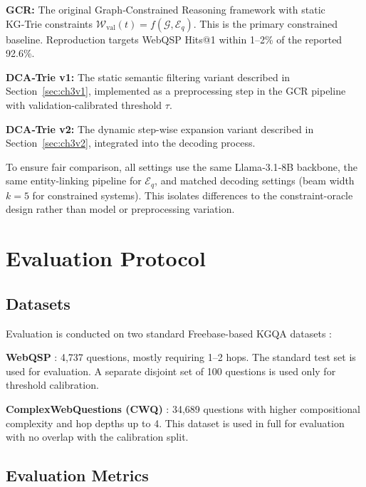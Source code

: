 \textbf{GCR:} The original Graph‑Constrained Reasoning framework \citep{luo2025-graph-constrained-reasoning} with static KG‑Trie constraints $\mathcal{W}_{\text{val}}(t)=f(\mathcal{G},\mathcal{E}_q)$. This is the primary constrained baseline. Reproduction targets WebQSP Hits@1 within 1--2\% of the reported 92.6\%.

\textbf{DCA‑Trie v1:} The static semantic filtering variant described in Section~\ref{sec:ch3v1}, implemented as a preprocessing step in the GCR pipeline with validation-calibrated threshold $\tau$.

\textbf{DCA‑Trie v2:} The dynamic step-wise expansion variant described in Section~\ref{sec:ch3v2}, integrated into the decoding process.

To ensure fair comparison, all settings use the same Llama‑3.1‑8B backbone, the same entity-linking pipeline for $\mathcal{E}_q$, and matched decoding settings (beam width $k=5$ for constrained systems). This isolates differences to the constraint-oracle design rather than model or preprocessing variation.

\section{Evaluation Protocol}
\label{sec:ch3eval}

\subsection{Datasets}

Evaluation is conducted on two standard Freebase-based KGQA datasets \citep{bollacker2008freebase}:

\textbf{WebQSP} \citep{yih2016websqp}: 4,737 questions, mostly requiring 1--2 hops. The standard test set is used for evaluation. A separate disjoint set of 100 questions is used only for threshold calibration.

\textbf{ComplexWebQuestions (CWQ)} \citep{talmor2018cwq}: 34,689 questions with higher compositional complexity and hop depths up to 4. This dataset is used in full for evaluation with no overlap with the calibration split.

\subsection{Evaluation Metrics}

